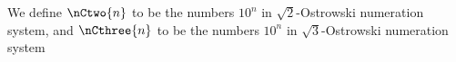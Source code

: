 \begin{definition}
We define $\nCtwo{n}$ to be the numbers $10^n$ in $\sqrt2$-Ostrowski numeration system, and $\nCthree{n}$ to be the numbers $10^n$ in $\sqrt3$-Ostrowski numeration system
\end{definition}



